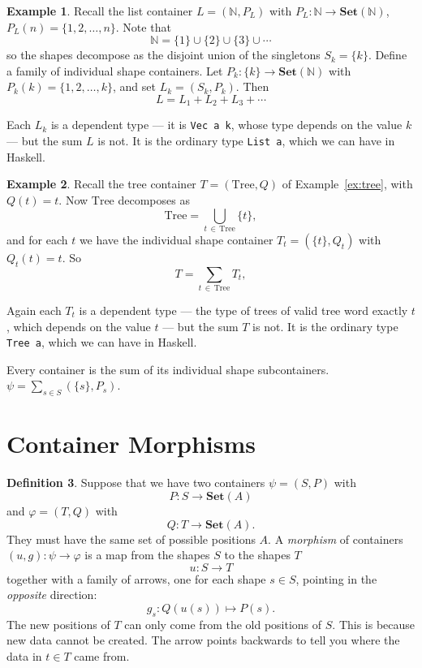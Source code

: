 \documentclass[11pt, a4paper]{article}
\theoremstyle{definition}
\newtheorem{definition}{Definition}[section]
\newtheorem{example}[definition]{Example}
\theoremstyle{plain}
\begin{document}
\begin{example}\label{ex:list-sum}
Recall the list container $L = (\mathbb{N}, P_L)$ with
$P_L : \mathbb{N} \to \mathbf{Set}(\mathbb{N})$,
$P_L(n) = \{1, 2, \ldots, n\}$.  Note that
\[
  \mathbb{N} = \{1\} \cup \{2\} \cup \{3\} \cup \cdots
\]
so the shapes decompose as the disjoint union of the singletons
$S_k = \{k\}$.  Define a family of individual shape containers.  Let
$P_k : \{k\} \to \mathbf{Set}(\mathbb{N})$ with
$P_k(k) = \{1, 2, \ldots, k\}$, and set $L_k = (S_k, P_k)$.  Then
\[
  L = L_1 + L_2 + L_3 + \cdots
\]
\noindent\colorbox{blue!10}{\parbox{\dimexpr\linewidth-2\fboxsep}{%
Each $L_k$ is a dependent type --- it is \texttt{Vec a k}, whose
type depends on the value $k$ --- but the sum $L$ is not.  It is
the ordinary type \texttt{List a}, which we can have in Haskell.%
}}
\end{example}

\begin{example}\label{ex:tree-sum}
Recall the tree container $T = (\mathrm{Tree}, Q)$ of
Example~\ref{ex:tree}, with $Q(t) = t$.  Now $\mathrm{Tree}$
decomposes as
\[
  \mathrm{Tree} = \bigcup_{t \,\in\, \mathrm{Tree}} \{t\},
\]
and for each $t$ we have the individual shape container
$T_t = (\{t\}, Q_t)$ with $Q_t(t) = t$.  So
\[
  T = \sum_{t \,\in\, \mathrm{Tree}} T_t,
\]
\noindent\colorbox{blue!10}{\parbox{\dimexpr\linewidth-2\fboxsep}{%
Again each $T_t$ is a dependent type --- the type of trees of valid tree word
exactly $t$, which depends on the value $t$ --- but the sum $T$ is
not.  It is the ordinary type \texttt{Tree a}, which we can have in
Haskell.%
}}
\end{example}

Every container is the sum of its individual shape subcontainers.
$\psi = \sum_{s \in S} (\{s\}, P_s)$.

\section{Container Morphisms}

\noindent\colorbox{gray!15}{\parbox{\dimexpr\linewidth-2\fboxsep}{%
\begin{definition}\label{def:morphism}
Suppose that we have two containers $\psi = (S, P)$ with
\[
  P : S \to \mathbf{Set}(A)
\]
and $\varphi = (T, Q)$ with
\[
  Q : T \to \mathbf{Set}(A).
\]
They must have the same set of possible positions $A$.
A \emph{morphism} of containers $(u, g) : \psi \to \varphi$ is a map
from the shapes $S$ to the shapes $T$
\[
  u : S \to T
\]
together with a family of arrows, one for each shape $s \in S$,
pointing in the \emph{opposite} direction:
\[
  g_s : Q(u(s)) \mapsto P(s).
\]
The new positions of $T$ can only come from the old positions of
$S$.  This is because new data cannot be created.  The arrow points
backwards to tell you where the data in $t \in T$ came from.
\end{definition}%
}}
\end{document}
